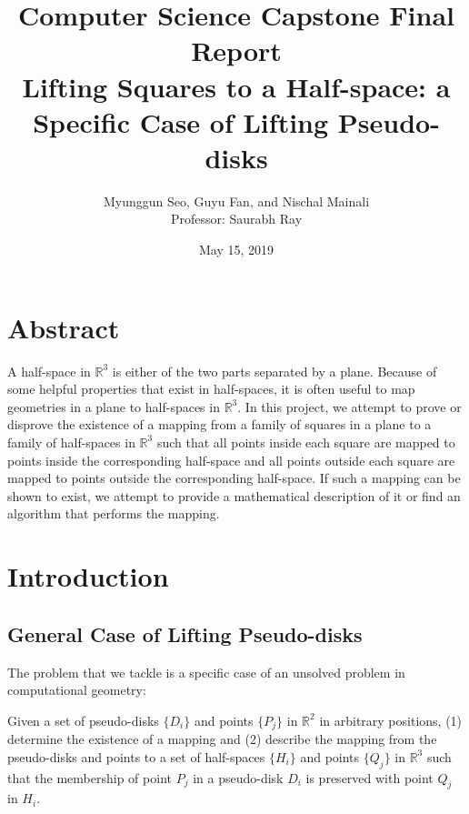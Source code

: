 \documentclass{NSF}
\begin{document}
\title{{\normalfont Computer Science Capstone Final Report}\\Lifting Squares to a Half-space: a Specific Case of Lifting Pseudo-disks}
\author{Myunggun Seo,  Guyu Fan, and Nischal Mainali \\ Professor: Saurabh Ray}
\date{May 15, 2019}


{\let\newpage\relax\maketitle}

\section{Abstract}
A half-space in $\mathbb{R}^3$ is either of the two parts separated by a plane. Because of some helpful properties that exist in half-spaces, it is often useful to map geometries in a plane to half-spaces in  $\mathbb{R}^3$. In this project, we attempt to prove or disprove the existence of a mapping from a family of squares in a plane to a family of half-spaces in $\mathbb{R}^3$ such that all points inside each square are mapped to points inside the corresponding half-space and all points outside each square are mapped to points outside the corresponding half-space. If such a mapping can be shown to exist, we attempt to provide a mathematical description of it or find an algorithm that performs the mapping.

\newpage
\tableofcontents

\newpage
\section{Introduction}
\subsection{General Case of Lifting Pseudo-disks}
The problem that we tackle is a specific case of an unsolved problem in computational geometry: 

Given a set of pseudo-disks $\{D_i\}$ and points $\{P_j\}$ in $\mathbb{R}^2$ in arbitrary positions, (1) determine the existence of a mapping and (2) describe the mapping from the pseudo-disks and points to a set of half-spaces $\{H_i\}$ and points $\{Q_j\}$ in $\mathbb{R}^3$ such that the membership of point $P_j$ in a pseudo-disk $D_i$ is preserved with point $Q_j$ in $H_i$. 
\end{document}
